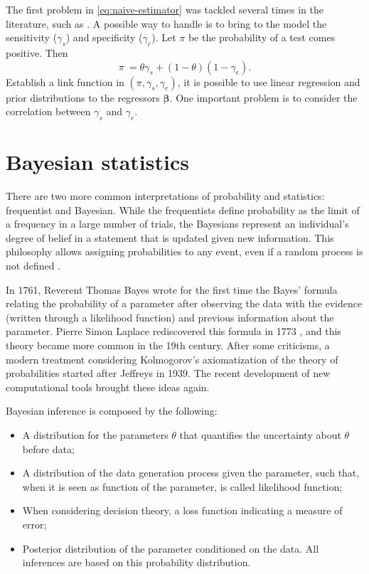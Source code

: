 The first problem in \eqref{eq:naive-estimator} was tackled several times in
the literature, such as \cite{mcinturff2004modelling}. A possible way to
handle is to bring to the model the sensitivity ($\gamma_s$) and specificity
($\gamma_e$). Let $\pi$ be the probability of a test comes positive. Then 
$$
\pi\ = \theta\gamma_s + (1-\theta)(1-\gamma_e).
$$
Establish a link function in $(\pi, \gamma_s, \gamma_e)$, it is possible to
use linear regression and prior distributions to the regressors
$\boldsymbol{\beta}$. One important problem is to consider the correlation
between $\gamma_s$ and $\gamma_e$. 

\section{Bayesian statistics}

There are two more common interpretations of probability and statistics:
frequentist and Bayesian. While the frequentists define
probability as the limit of a frequency in a large number of trials, the
Bayesians represent an individual's degree of belief in a statement that is
updated given new information. This philosophy allows assigning probabilities
to any event, even if a random process is not defined \cite{statisticat2016laplacesdemon}. 

In 1761, Reverent Thomas Bayes wrote for the first time the Bayes' formula
relating the probability of a parameter after observing the data with the
evidence (written through a likelihood function) and previous information
about the parameter. Pierre Simon Laplace rediscovered this formula in 1773
\cite{Robert2007}, and this theory became more common in the 19th century.
After some criticisms, a modern treatment considering Kolmogorov's axiomatization of the theory of probabilities started after Jeffreys in 1939.
The recent development of new computational tools brought these ideas again.

Bayesian inference is composed by the following: 

\begin{itemize}
    \item A distribution for the parameters $\theta$ that quantifies the
    uncertainty about $\theta$ before data;
    \item A distribution of the data generation process given the parameter,
    such that, when it is seen as function of the parameter, is called
    likelihood function;
    \item When considering decision theory, a loss function indicating a
    measure of error;
    \item Posterior distribution of the parameter conditioned on the data. All
    inferences are based on this probability distribution.
\end{itemize} 